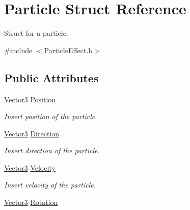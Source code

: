 \hypertarget{struct_particle}{}\section{Particle Struct Reference}
\label{struct_particle}


Struct for a particle.  




{\ttfamily \#include $<$Particle\+Effect.\+h$>$}

\subsection*{Public Attributes}
\begin{DoxyCompactItemize}
\item 
\mbox{\label{struct_particle_a2dc5b1d9b0a6a1358c744c196c9f253c}} 
\mbox{\hyperlink{struct_vector3}{Vector3}} \mbox{\hyperlink{struct_particle_a2dc5b1d9b0a6a1358c744c196c9f253c}{Position}}
\begin{DoxyCompactList}\small\item\em Insert position of the particle. \end{DoxyCompactList}\item 
\mbox{\label{struct_particle_ac08e93daabcffb2d4a2fc8f13235aa63}} 
\mbox{\hyperlink{struct_vector3}{Vector3}} \mbox{\hyperlink{struct_particle_ac08e93daabcffb2d4a2fc8f13235aa63}{Direction}}
\begin{DoxyCompactList}\small\item\em Insert direction of the particle. \end{DoxyCompactList}\item 
\mbox{\label{struct_particle_a412b942c7a0c834addef95185eaf15b1}} 
\mbox{\hyperlink{struct_vector3}{Vector3}} \mbox{\hyperlink{struct_particle_a412b942c7a0c834addef95185eaf15b1}{Velocity}}
\begin{DoxyCompactList}\small\item\em Insert velocity of the particle. \end{DoxyCompactList}\item 
\mbox{\label{struct_particle_a8656807befba981c720bff0b9cba6b54}} 
\mbox{\hyperlink{struct_vector3}{Vector3}} \mbox{\hyperlink{struct_particle_a8656807befba981c720bff0b9cba6b54}{Rotation}}

\end{DoxyCompactItemize}

